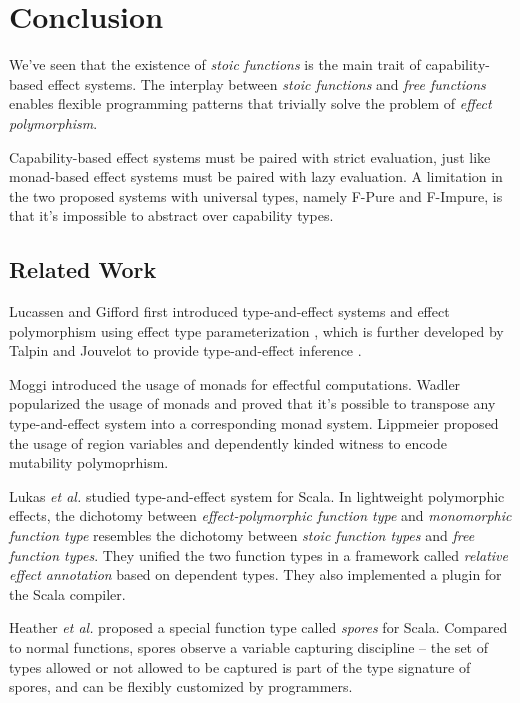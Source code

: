 \section{Conclusion}

We've seen that the existence of \emph{stoic functions} is the main
trait of capability-based effect systems. The interplay between
\emph{stoic functions} and \emph{free functions} enables flexible
programming patterns that trivially solve the problem of \emph{effect
  polymorphism}.

Capability-based effect systems must be paired with strict evaluation,
just like monad-based effect systems must be paired with lazy
evaluation. A limitation in the two proposed systems with universal
types, namely F-Pure and F-Impure, is that it's impossible to abstract
over capability types.

\subsection{Related Work}

Lucassen and Gifford first introduced type-and-effect
systems\cite{gifford1986integrating} and effect polymorphism using
effect type parameterization \cite{lucassen1988polymorphic}, which is
further developed by Talpin and Jouvelot to provide type-and-effect
inference \cite{talpin1992polymorphic, talpin1994type}.

Moggi introduced the usage of monads for effectful
computations\cite{moggi1991notions}. Wadler popularized the usage of
monads\cite{wadler1992comprehending, wadler1995monads} and proved that
it's possible to transpose any type-and-effect system into a
corresponding monad system\cite{wadler2003marriage}. Lippmeier
proposed the usage of region variables and dependently kinded witness
to encode mutability polymoprhism\cite{lippmeier2009witnessing}.

Lukas \emph{et al.}  studied type-and-effect system for
Scala\cite{rytz2012lightweight, rytz2013flow, lukas2014effect}.  In
lightweight polymorphic effects\cite{rytz2012lightweight}, the
dichotomy between \emph{effect-polymorphic function type} and
\emph{monomorphic function type} resembles the dichotomy between
\emph{stoic function types} and \emph{free function types}.  They
unified the two function types in a framework called \emph{relative
  effect annotation} based on dependent types. They also implemented a
plugin for the Scala compiler.

Heather \emph{et al.} proposed a special function type called
\emph{spores} for Scala\cite{miller2014spores}. Compared to normal
functions, spores observe a variable capturing discipline -- the set
of types allowed or not allowed to be captured is part of the type
signature of spores, and can be flexibly customized by programmers.

